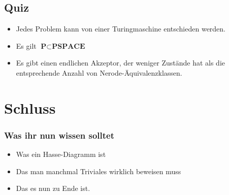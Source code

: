 
\newcommand{\mydate}{05.02.2013}

\newcommand{\handout}{}



\graphicspath{{../figures/}}




\subsection{Quiz}
\begin{frame}
	\begin{itemize}
		\item<1-> Jedes Problem kann von einer Turingmaschine entschieden werden.
		\item<3-> Es gilt $ \textbf{P} \subset \textbf{PSPACE} $
		\item<5-> Es gibt einen endlichen Akzeptor, der weniger Zustände hat als die entsprechende Anzahl von Nerode-Äquivalenzklassen.
	\end{itemize}
\end{frame}





\section{Schluss}
\begin{frame}
	\frametitle{Was ihr nun wissen solltet}
	\begin{itemize}
		\item Was ein Hasse-Diagramm ist
		\item Das man manchmal Triviales wirklich beweisen muss
		\item Das es nun zu Ende ist.
	\end{itemize}
\end{frame}


